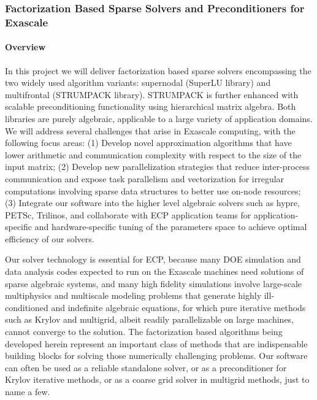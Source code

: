 \newcommand{\ignore}[1]{}
\subsubsection{ Factorization Based Sparse Solvers and Preconditioners for Exascale} \label{subsubsect:strumpack}

\paragraph{Overview} 
In this project we will deliver factorization based sparse solvers
encompassing the two widely used algorithm variants: supernodal
(SuperLU library) and multifrontal (STRUMPACK library). STRUMPACK is
further enhanced with scalable preconditioning functionality using
hierarchical matrix algebra. Both libraries are purely algebraic,
applicable to a large variety of application domains. We will address
several challenges that arise in Exascale computing, with the following
focus areas: 
(1) Develop novel approximation algorithms that have lower
arithmetic and communication complexity with respect to the size of the
input matrix;
(2) Develop new parallelization strategies that reduce
inter-process communication and expose task parallelism and vectorization
for irregular computations involving sparse data structures to better
use on-node resources;
(3) Integrate our software into the higher level
algebraic solvers such as hypre, PETSc, Trilinos, and collaborate with
ECP application teams for application-specific and hardware-specific tuning
of the parameters space to achieve optimal efficiency of our solvers.

Our solver technology is essential for ECP, because many DOE simulation
and data analysis codes expected to run on the Exascale machines need
solutions of sparse algebraic systems, and many high fidelity simulations
involve large-scale multiphysics and multiscale modeling problems that
generate highly ill-conditioned and indefinite algebraic equations,
for which pure iterative methods such as Krylov and multigrid, albeit
readily parallelizable on large machines, cannot converge to the solution.
The factorization based algorithms being developed herein
represent an important class of methods that are indispensable building
blocks for solving those numerically challenging problems. Our software
can often be used as a reliable standalone solver, or as a preconditioner
for Krylov iterative methods, or as a coarse grid solver in multigrid
methods, just to name a few.

